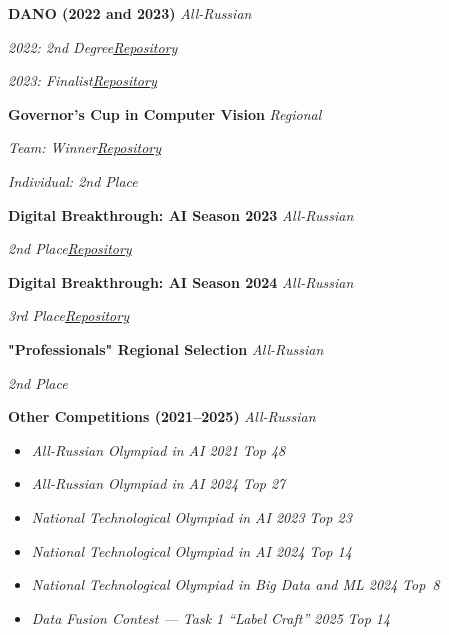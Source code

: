 
\textbf{DANO (2022 and 2023)} \hfill \emph{All-Russian}

\textit{2022: 2nd Degree}\hfill \emph{\href{https://github.com/D1ffic00lt/dano-olympiad-final-stage}{Repository}}\vspace{0cm}

\textit{2023: Finalist}\hfill \emph{\href{https://github.com/D1ffic00lt/dano-2023}{Repository}}\vspace{0.1cm}

\textbf{Governor’s Cup in Computer Vision} \hfill \emph{Regional}

\textit{Team: Winner}\hfill \emph{\href{https://github.com/D1ffic00lt/computer-vision-cup}{Repository}}\vspace{0cm}

\textit{Individual: 2nd Place}\vspace{0.1cm}


\textbf{Digital Breakthrough: AI Season 2023} \hfill \emph{All-Russian}

\textit{2nd Place}\hfill \emph{\href{https://github.com/llitone/rutube-video-captioning}{Repository}}\vspace{0.1cm}


\textbf{Digital Breakthrough: AI Season 2024} \hfill \emph{All-Russian}

\textit{3rd Place}\hfill \emph{\href{https://github.com/D1ffic00lt/Sky-Eye}{Repository}}\vspace{0.1cm}

\textbf{"Professionals" Regional Selection} \hfill \emph{All-Russian}

\textit{2nd Place}\vspace{0.1cm}

\textbf{Other Competitions (2021–2025)} \hfill \emph{All-Russian}

\begin{itemize}[
    label=$\cdot$, 
    itemsep=0.1em,
    topsep=0pt,
    parsep=0pt
]
    \item \textit{All-Russian Olympiad in AI 2021} \hfill \emph{Top 48}
    \item \textit{All-Russian Olympiad in AI 2024} \hfill \emph{Top 27}
    \item \textit{National Technological Olympiad in AI 2023} \hfill \emph{Top 23}
    \item \textit{National Technological Olympiad in AI 2024} \hfill \emph{Top 14}
    \item \textit{National Technological Olympiad in Big Data and ML 2024} \hfill \mbox{\emph{Top 8}\hspace{1ex}} 
    \item \textit{Data Fusion Contest — Task 1 “Label Craft” 2025} \hfill \emph{Top 14}
\end{itemize}
